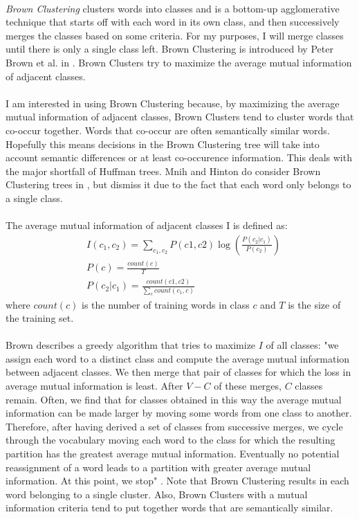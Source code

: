 \paragraph{}
\emph{Brown Clustering} clusters words into classes and is a bottom-up agglomerative technique that starts off with each word in its own class, and then successively merges the classes based on some criteria. For my purposes, I will merge classes until there is only a single class left.  Brown Clustering is introduced by Peter Brown et al. in \cite{Brown1992}.
Brown Clusters try to maximize the average mutual information of adjacent classes.
\paragraph{}
I am interested in using Brown Clustering because, by maximizing the average mutual information of adjacent classes, Brown Clusters tend to cluster words that co-occur together. Words that co-occur are often semantically similar words. Hopefully this means decisions in the Brown Clustering tree will take into account semantic differences or at least co-occurence information. This deals with the major shortfall of Huffman trees. Mnih and Hinton do consider Brown Clustering trees in \cite{MnihHinton2009}, but dismiss it due to the fact that each word only belongs to a single class. 
\paragraph{}
The average mutual information of adjacent classes I is defined as:
\begin{align}
& I(c_1,c_2) =\sum_{c_1,c_2} P(c1,c2)  \log \left( \frac{P(c_2|c_1)}{P(c_2)} \right)
\\
&P(c) = \frac{count(c)}{T} \nonumber
\\
&P(c_2|c_1) = \frac{count(c1,c2)}{\sum_c count(c_1,c)} \nonumber
\end{align}
where $count(c)$ is the number of training words in class $c$ and $T$ is the size of the training set.
\paragraph{}
Brown describes a greedy algorithm that tries to maximize $I$ of all classes: "we assign each word to a distinct class and compute the average mutual information 
between adjacent classes. We then merge that pair of classes for which the loss in 
average mutual information is least. After $V - C$ of these merges, $C$ classes remain. 
Often, we find that for classes obtained in this way the average mutual information 
can be made larger by moving some words from one class to another. Therefore, after 
having derived a set of classes from successive merges, we cycle through the vocabulary moving each word to the class for which the resulting partition has the greatest 
average mutual information. Eventually no potential reassignment of a word leads to 
a partition with greater average mutual information. At this point, we stop" \cite[pg. 472]{Brown1992}.  
Note that Brown Clustering results in each word belonging to a single cluster. Also, Brown Clusters with a mutual information criteria tend to put together words that are semantically similar.
